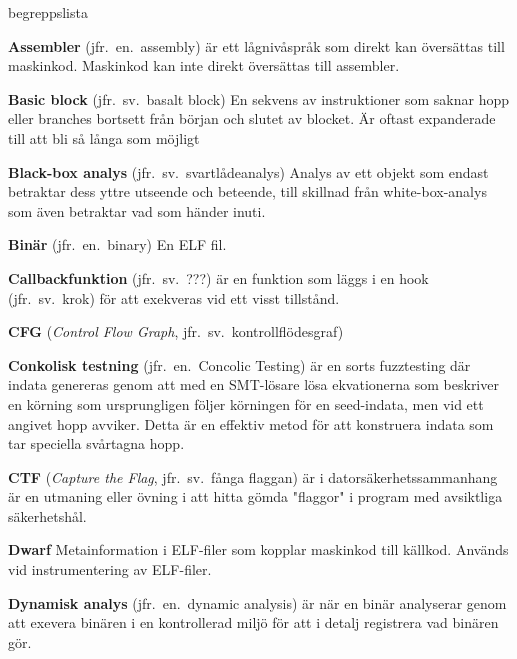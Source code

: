 \begin{labeling}{begreppslista}

    \item [\textbf{Assembler}] (jfr.\ en.\ assembly) är ett lågnivåspråk som
    direkt kan översättas till maskinkod. Maskinkod kan inte direkt översättas
    till assembler.

    \item[\textbf{Basic block}] (jfr.\ sv.\ basalt block) En sekvens av
    instruktioner som saknar hopp eller branches bortsett från början och slutet
    av blocket. Är oftast expanderade till att bli så långa som möjligt

    \item [\textbf{Black-box analys}] (jfr.\ sv.\ svartlådeanalys) Analys av ett
    objekt som endast betraktar dess yttre utseende och beteende, till skillnad
    från white-box-analys som även betraktar vad som händer inuti.

    \item [\textbf{Binär}] (jfr.\ en.\ binary) En ELF fil.

    \item [\textbf{Callbackfunktion}] (jfr.\ sv.\ ???) är en funktion som läggs i en
    hook (jfr.\ sv.\ krok) för att exekveras vid ett visst tillstånd.

    \item [\textbf{CFG}] (\emph{Control Flow Graph}, jfr.\ sv.\
          kontrollflödesgraf)

    \item [\textbf{Conkolisk testning}] (jfr.\ en.\ Concolic Testing) är en sorts
    fuzztesting där indata genereras genom att med en SMT-lösare lösa
    ekvationerna som beskriver en körning som ursprungligen följer körningen för
    en seed-indata, men vid ett angivet hopp avviker. Detta är en effektiv metod
    för att konstruera indata som tar speciella svårtagna hopp.

    \item [\textbf{CTF}] (\emph{Capture the Flag}, jfr.\ sv.\ fånga flaggan) är i
    datorsäkerhetssammanhang är en utmaning eller övning i att hitta gömda
    "flaggor" i program med avsiktliga säkerhetshål.

    \item [\textbf{Dwarf}] Metainformation i ELF-filer som kopplar maskinkod
    till källkod. Används vid instrumentering av ELF-filer.

    \item [\textbf{Dynamisk analys}] (jfr.\ en.\ dynamic analysis) är när en binär
    analyserar genom att exevera binären i en kontrollerad miljö för att i
    detalj registrera vad binären gör.


\end{labeling}

